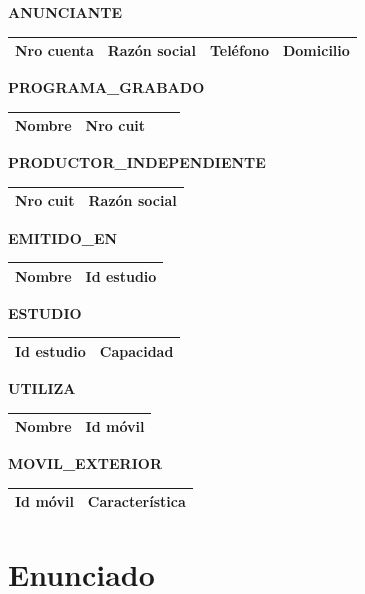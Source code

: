 \documentclass[a4paper,10pt]{article}
\begin{document}
\begin{flushleft}
      \begin{large} \bf{ANUNCIANTE} \end{large}
      \newline
      \begin{tabular}{| l | l | l | l |}
	\hline Nro cuenta & Raz\'on social & Tel\'efono & Domicilio \\ \hline
      \end{tabular}

      \begin{large} \bf{PROGRAMA\_GRABADO} \end{large}
      \newline
      \begin{tabular}{| l | l | l | l |}
	\hline Nombre & Nro cuit \\ \hline
      \end{tabular}

      \begin{large} \bf{PRODUCTOR\_INDEPENDIENTE} \end{large}
      \newline
      \begin{tabular}{| l | l |}
	\hline Nro cuit & Raz\'on social \\ \hline
      \end{tabular}

      \begin{large} \bf{EMITIDO\_EN} \end{large}
      \newline
      \begin{tabular}{| l | l |}
	\hline Nombre & Id estudio \\ \hline
      \end{tabular}

      \begin{large} \bf{ESTUDIO} \end{large}
      \newline
      \begin{tabular}{| l | l |}
	\hline Id estudio & Capacidad \\ \hline
      \end{tabular}

      \begin{large} \bf{UTILIZA} \end{large}
      \newline
      \begin{tabular}{| l | l |}
	\hline Nombre & Id m\'ovil \\ \hline
      \end{tabular}

      \begin{large} \bf{MOVIL\_EXTERIOR} \end{large}
      \newline
      \begin{tabular}{| l | l |}
	\hline Id m\'ovil & Caracter\'istica \\ \hline
      \end{tabular}
    \end{flushleft}

\appendix
\newpage
\section{Enunciado}
  
\end{document}

